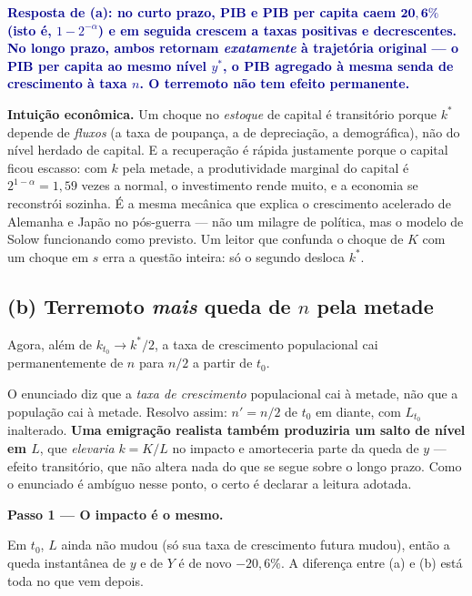 \documentclass[11pt, a4paper]{article}
\newcommand{\passo}[1]{\medskip\noindent\textbf{#1}\par\nobreak}
\newcommand{\intuicao}[1]{%
  \medskip\noindent\textcolor{midblue}{\textbf{Intuição econômica.}} #1\par}
\newcommand{\resp}[1]{\textcolor{darkblue}{\textbf{#1}}}
\newcommand{\stst}{^{\ast}}
\begin{document}
\resp{Resposta de (a): no curto prazo, PIB e PIB per capita caem $\bm{20{,}6\%}$ (isto é,
$1-2^{-\alpha}$) e em seguida crescem a taxas positivas e decrescentes. No longo prazo,
ambos retornam \emph{exatamente} à trajetória original --- o PIB per capita ao mesmo nível
$y\stst$, o PIB agregado à mesma senda de crescimento à taxa $n$. O terremoto não tem
efeito permanente.}

\intuicao{Um choque no \emph{estoque} de capital é transitório porque $k\stst$ depende de
\emph{fluxos} (a taxa de poupança, a de depreciação, a demográfica), não do nível herdado
de capital. E a recuperação é rápida justamente porque o capital ficou escasso: com
$k$ pela metade, a produtividade marginal do capital é $2^{1-\alpha} = 1{,}59$ vezes a
normal, o investimento rende muito, e a economia se reconstrói sozinha. É a mesma mecânica
que explica o crescimento acelerado de Alemanha e Japão no pós-guerra --- não um milagre
de política, mas o modelo de Solow funcionando como previsto. Um leitor que confunda o
choque de $K$ com um choque em $s$ erra a questão inteira: só o segundo desloca $k\stst$.}

\subsection*{(b) Terremoto \emph{mais} queda de $n$ pela metade}

Agora, além de $k_{t_0} \to k\stst/2$, a taxa de crescimento populacional cai
permanentemente de $n$ para $n/2$ a partir de $t_0$.

\begin{tcolorbox}[theorybox, title={Leitura do enunciado --- declare a sua}]
\small
O enunciado diz que a \emph{taxa de crescimento} populacional cai à metade, não que a
população cai à metade. Resolvo assim: $n' = n/2$ de $t_0$ em diante, com $L_{t_0}$
inalterado. \textbf{Uma emigração realista também produziria um salto de nível em $L$},
que \emph{elevaria} $k = K/L$ no impacto e amorteceria parte da queda de $y$ --- efeito
transitório, que não altera nada do que se segue sobre o longo prazo. Como o enunciado é
ambíguo nesse ponto, o certo é declarar a leitura adotada.
\end{tcolorbox}

\passo{Passo 1 --- O impacto é o mesmo.} Em $t_0$, $L$ ainda não mudou (só sua taxa de
crescimento futura mudou), então a queda instantânea de $y$ e de $Y$ é de novo
$-20{,}6\%$. A diferença entre (a) e (b) está toda no que vem depois.
\end{document}
